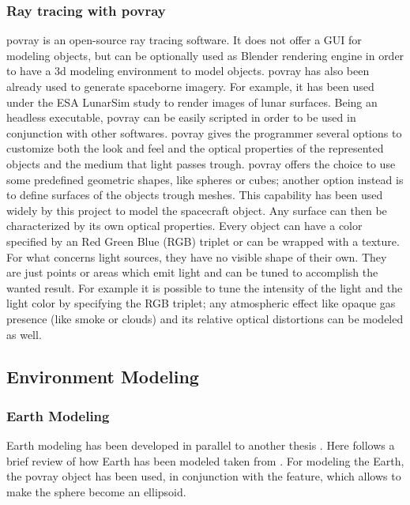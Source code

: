 \subsubsection{Ray tracing with \acrshort{povray}}
\acrshort{povray} is an open-source ray tracing software. It does not offer a GUI for modeling objects, but can be optionally used as Blender rendering engine in order to have a \acrshort{3d} modeling environment to model objects. \acrshort{povray} has also been already used to generate spaceborne imagery. For example, it has been used under the ESA LunarSim study to render images of lunar surfaces. Being an headless executable, \acrshort{povray} can be easily scripted in order to be used in conjunction with other softwares.
\acrshort{povray} gives the programmer several options to customize both the look and feel and the optical properties of the represented objects and the medium that light passes trough. \acrshort{povray} offers the choice to use some predefined geometric shapes, like spheres or cubes; another option instead is to define surfaces of the objects trough meshes. This capability has been used widely by this project to model the spacecraft object.
Any surface can then be characterized by its own optical properties. Every object can have a color specified by an Red Green Blue (RGB) triplet or can be wrapped with a texture.\\
For what concerns light sources, they have no visible shape of their own. They are just points or areas which emit light and can be tuned to accomplish the wanted result. For example it is possible to tune the intensity of the light and the light color by specifying the RGB triplet; any atmospheric effect like opaque gas presence (like smoke or clouds) and its relative optical distortions can be modeled as well.

\subsection{Environment Modeling}
\subsubsection{Earth Modeling}
Earth modeling has been developed in parallel to another thesis \cite{jacopo}.
Here follows a brief review of how Earth has been modeled taken from \cite{jacopo}.
For modeling the Earth, the \acrshort{povray}  object has been used, in conjunction with the  feature, which allows to make the sphere become an ellipsoid.

